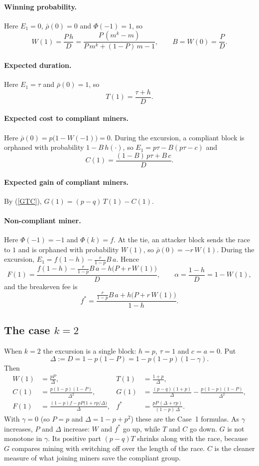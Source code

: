 \documentclass{article}%
\begin{document}
\paragraph{Winning probability.} Here $E_{1}=0$, $\bar{\rho}(0)=0$ and
$\Phi(-1)=1$, so%
\[
W(1)=\frac{P\,h}{D}=\frac{P\,(m^{k}-m)}{P\,m^{k}+(1-P)\,m-1},\qquad
B=W(0)=\frac{P}{D}.
\]

\paragraph{Expected duration.} Here $E_{1}=\tau$ and $\bar{\rho}(0)=1$, so%
\[
T(1)=\frac{\tau+h}{D}.
\]

\paragraph{Expected cost to compliant miners.} Here $\bar{\rho}(0)=p\bigl(1-W(-1)\bigr)=0$.
During the excursion, a compliant block is orphaned with probability
$1-B\,h(\cdot)$, so $E_{1}=p\tau-B(p\tau-c)$ and%
\[
C(1)=\frac{(1-B)\,p\tau+B\,c}{D}.
\]

\paragraph{Expected gain of compliant miners.} By (\ref{GTC}),
$G(1)=(p-q)\,T(1)-C(1)$.

\paragraph{Non-compliant miner.} Here $\Phi(-1)=-1$ and $\Phi(k)=f$. At the
tie, an attacker block sends the race to $1$ and is orphaned with probability
$W(1)$, so $\bar{\rho}(0)=-r\,W(1)$. During the excursion,
$E_{1}=f(1-h)-\frac{r}{1-p}B\,a$. Hence%
\[
F(1)=\frac{f(1-h)-\frac{r}{1-p}B\,a-h\bigl(P+r\,W(1)\bigr)}{D},\qquad
\alpha=\frac{1-h}{D}=1-W(1),
\]
and the breakeven fee is%
\[
f^{\ast}=\frac{\frac{r}{1-p}B\,a+h\bigl(P+r\,W(1)\bigr)}{1-h}.
\]

\subsection{The case $k=2$}

When $k=2$ the excursion is a single block: $h=p$, $\tau=1$ and $c=a=0$. Put%
\[
\Delta:=D=1-p(1-P)=1-p(1-p)(1-\gamma).
\]
Then%
\begin{align*}
W(1)  &  =\frac{pP}{\Delta}, & T(1)  &  =\frac{1+p}{\Delta},\\
C(1)  &  =\frac{p(1-p)(1-P)}{\Delta^{2}}, & G(1)  &  =\frac{(p-q)(1+p)}%
{\Delta}-\frac{p(1-p)(1-P)}{\Delta^{2}},\\
F(1)  &  =\frac{(1-p)f-pP\bigl(1+rp/\Delta\bigr)}{\Delta}, & f^{\ast}  &
=\frac{pP\,(\Delta+rp)}{(1-p)\,\Delta}.
\end{align*}
With $\gamma=0$ (so $P=p$ and $\Delta=1-p+p^{2}$) these are the Case~1
formulas. As $\gamma$ increases, $P$ and $\Delta$ increase: $W$ and $f^{\ast}$
go up, while $T$ and $C$ go down. $G$ is not monotone in $\gamma$. Its
positive part $(p-q)T$ shrinks along with the race, because $G$ compares
mining with switching off over the length of the race. $C$ is the cleaner
measure of what joining miners save the compliant group.
\end{document}
